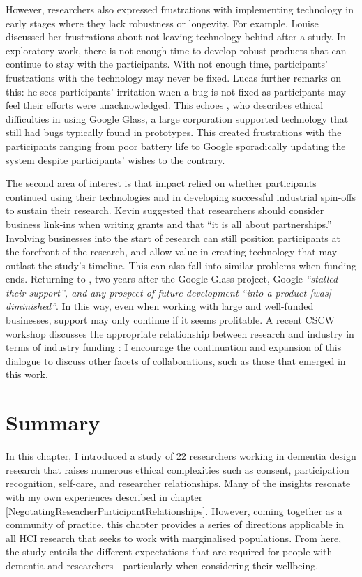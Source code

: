 However, researchers also expressed frustrations with implementing technology in early stages where they lack robustness or longevity. For example, Louise discussed her frustrations about not leaving technology behind after a study. In exploratory work, there is not enough time to develop robust products that can continue to stay with the participants. With not enough time, participants' frustrations with the technology may never be fixed. Lucas further remarks on this: he sees participants' irritation when a bug is not fixed as participants may feel their efforts were unacknowledged. This echoes \cite{vines_our_2017}, who describes ethical difficulties in using Google Glass, a large corporation supported technology that still had bugs typically found in prototypes. This created frustrations with the participants ranging from poor battery life to Google sporadically updating the system despite participants' wishes to the contrary. 

The second area of interest is that impact relied on whether participants continued using their technologies and in developing successful industrial spin-offs to sustain their research. Kevin suggested that researchers should consider business link-ins when writing grants and that “it is all about partnerships.” Involving businesses into the start of research can still position participants at the forefront of the research, and allow value in creating technology that may outlast the study’s timeline. This can also fall into similar problems when funding ends. Returning to \cite{vines_our_2017}, two years after the Google Glass project, Google \textit{“stalled their support”, and any prospect of future development “into a product [was] diminished”}. In this way, even when working with large and well-funded businesses, support may only continue if it seems profitable. A recent CSCW workshop discusses the appropriate relationship between research and industry in terms of industry funding \citep{group_patron_2019}: I encourage the continuation and expansion of this dialogue to discuss other facets of collaborations, such as those that emerged in this work.

\section{Summary}
\label{Ethics:Summary}
In this chapter, I introduced a study of 22 researchers working in dementia design research that raises numerous ethical complexities such as consent, participation recognition, self-care, and researcher relationships. Many of the insights resonate with my own experiences described in chapter \ref{NegotatingReseacherParticipantRelationships}. However, coming together as a community of practice, this chapter provides a series of directions applicable in all HCI research that seeks to work with marginalised populations. From here, the study entails the different expectations that are required for people with dementia and researchers - particularly when considering their wellbeing. 

